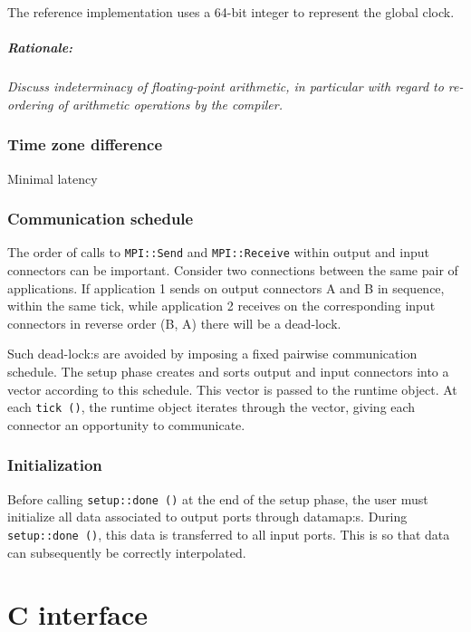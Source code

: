 \documentclass[a4paper]{report}
\newenvironment{rationale}%
{\par\paragraph{Rationale:}}%
{\par}
\begin{document}
The reference implementation uses a 64-bit integer to represent the
global clock.

\begin{rationale}
  \emph{Discuss indeterminacy of floating-point arithmetic, in particular
    with regard to re-ordering of arithmetic operations by the compiler.}
\end{rationale}

\subsection{Time zone difference}

Minimal latency

\subsection{Communication schedule}

The order of calls to \verb|MPI::Send| and \verb|MPI::Receive| within
output and input connectors can be important.  Consider two
connections between the same pair of applications.  If application 1
sends on output connectors A and B in sequence, within the same tick,
while application 2 receives on the corresponding input connectors in
reverse order (B, A) there will be a dead-lock.

Such dead-lock:s are avoided by imposing a fixed pairwise
communication schedule.  The setup phase creates and sorts output and
input connectors into a vector according to this schedule.  This
vector is passed to the runtime object.  At each \verb|tick ()|, the
runtime object iterates through the vector, giving each connector an
opportunity to communicate.

\subsection{Initialization}

Before calling \verb|setup::done ()| at the end of the setup phase,
the user must initialize all data associated to output ports through
datamap:s.  During \verb|setup::done ()|, this data is transferred to
all input ports.  This is so that data can subsequently be correctly
interpolated.

\appendix

\chapter{C interface}
\end{document}
